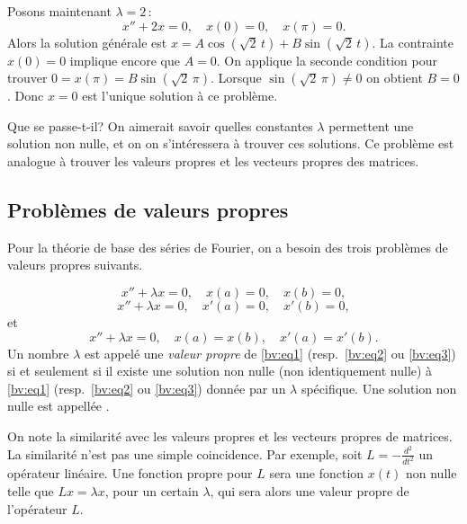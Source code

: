 \begin{example}
Posons maintenant $\lambda = 2$\,: 
\begin{equation*}
x'' + 2 x = 0, \quad x(0) = 0, \quad x(\pi) = 0.
\end{equation*}
Alors la solution générale est
$x= A \cos ( \sqrt{2}\,t) + B \sin ( \sqrt{2}\,t)$.  La contrainte $x(0) = 0$ implique encore que $A = 0$.  On applique la seconde condition pour trouver 
$0=x(\pi) = B \sin ( \sqrt{2}\,\pi)$.
Lorsque $\sin ( \sqrt{2}\,\pi) \not= 0$ on obtient
$B = 0$.  
Donc $x=0$ est l'unique solution à ce problème.
\end{example}

Que se passe-t-il?  On aimerait savoir quelles constantes  $\lambda$ permettent une solution non nulle, et on on s'intéressera à trouver ces solutions. Ce problème est analogue  à trouver les valeurs propres et les vecteurs propres des matrices.

\subsection{Problèmes de valeurs propres}

Pour la théorie de base des séries de Fourier, on a besoin
des trois problèmes de valeurs propres suivants. 

\begin{equation} \label{bv:eq1}
x'' + \lambda x = 0, \quad x(a) = 0, \quad x(b) = 0 ,
\end{equation}
\begin{equation} \label{bv:eq2}
x'' + \lambda x = 0, \quad x'(a) = 0, \quad x'(b) = 0 ,
\end{equation}
et
\begin{equation} \label{bv:eq3}
x'' + \lambda x = 0, \quad x(a) = x(b), \quad x'(a) = x'(b) .
\end{equation}
Un nombre $\lambda$ est appelé une
\emph{valeur propre }
de \eqref{bv:eq1}
(resp.\ \eqref{bv:eq2} ou \eqref{bv:eq3}) si et seulement si il existe une solution non nulle (non identiquement nulle) à \eqref{bv:eq1}
(resp.\ \eqref{bv:eq2} ou \eqref{bv:eq3})
donnée par un $\lambda$ spécifique.  Une solution non nulle est appellée 
\emph{}.

On note la similarité avec les valeurs propres et les vecteurs propres de matrices. La similarité n'est pas une simple coincidence.  Par exemple, soit $L = -\frac{d^2}{{dt}^2}$ un opérateur linéaire.  Une fonction propre pour $L$ sera une fonction $x(t)$ non nulle telle que $Lx = \lambda x$, pour un certain $\lambda$, qui sera alors une valeur propre de l'opérateur $L$.

